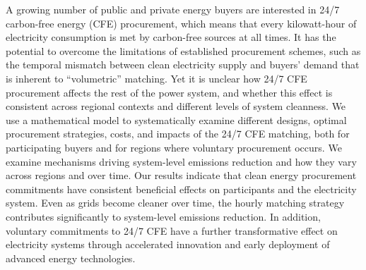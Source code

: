 %

A growing number of public and private energy buyers are interested in 24/7 carbon-free energy (CFE) procurement, which means that every kilowatt-hour of electricity consumption is met by carbon-free sources at all times.
It has the potential to overcome the limitations of established procurement schemes, such as the temporal mismatch between clean electricity supply and buyers' demand that is inherent to \enquote{volumetric} matching. 
Yet it is unclear how 24/7 CFE procurement affects the rest of the power system, and whether this effect is consistent across regional contexts and different levels of system cleanness.
We use a mathematical model to systematically examine different designs, optimal procurement strategies, costs, and impacts of the 24/7 CFE matching, both for participating buyers and for regions where voluntary procurement occurs.
We examine mechanisms driving system-level emissions reduction and how they vary across regions and over time.
Our results indicate that clean energy procurement commitments have consistent beneficial effects on participants and the electricity system.
Even as grids become cleaner over time, the hourly matching strategy contributes significantly to system-level emissions reduction.
In addition, voluntary commitments to 24/7 CFE have a further transformative effect on electricity systems through accelerated innovation and early deployment of advanced energy technologies.


